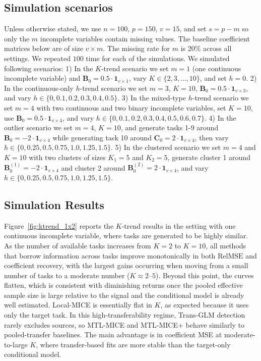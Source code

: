 \documentclass[12pt]{article}
\begin{document}
\subsection{Simulation scenarios}
Unless otherwise stated, we use $n=100$, $p=150$, $v=15$, and set $s=p-m$ so only the $m$ incomplete
variables contain missing values. The baseline coefficient matrices below are of size $v\times m$. The missing rate for $m$ is 20\% across all settings. We repeated $100$ time for each of the simulations. We simulated following scenarios: 1) In the $K$-trend scenario we set $m=1$ (one continuous incomplete variable) and $\bm{B}_0=0.5\cdot \bm{1}_{v\times 1}$, vary $K\in\{2,3,\dots,10\}$, and set $h=0$. 2) In the continuous-only $h$-trend scenario we set $m=3$, $K=10$, $\bm{B}_0=0.5\cdot \bm{1}_{v\times 3}$, and vary $h\in\{0,0.1,0.2,0.3,0.4,0.5\}$. 3) In the mixed-type $h$-trend scenario we set $m=4$ with two continuous and two binary incomplete variables, set $K=10$, use $\bm{B}_0=0.5\cdot \bm{1}_{v\times 4}$, and vary $h\in\{0,0.1,0.2,0.3,0.4,0.5,0.6,0.7\}$. 4) In the outlier scenario we set $m=4$, $K=10$, and generate tasks 1-9 around $\bm{B}_0=-2\cdot \bm{1}_{v\times 4}$ while generating task 10 around $\bm{C}_0=2\cdot \bm{1}_{v\times 4}$, then vary $h\in\{0,0.25,0.5,0.75,1.0,1.25,1.5\}$. 5) In the clustered scenario we set $m=4$ and $K=10$ with two clusters of sizes $K_1=5$ and $K_2=5$, generate cluster 1 around $\bm{B}^{(1)}_0=-2\cdot \bm{1}_{v\times 4}$ and cluster 2 around $\bm{B}^{(2)}_0=2\cdot \bm{1}_{v\times 4}$, and vary $h\in\{0,0.25,0.5,0.75,1.0,1.25,1.5\}$.

\subsection{Simulation Results}

Figure~\ref{fig:ktrend_1x2} reports the $K$-trend results in the setting with one continuous incomplete variable, where tasks are generated to be highly similar. As the number of available tasks increases from $K=2$ to $K=10$, all methods that borrow information across tasks improve monotonically in both $\mathrm{RelMSE}$ and coefficient recovery, with the largest gains occurring when moving from a small number of tasks to a moderate number ($K\approx 2$--$5$). Beyond this point, the curves flatten, which is consistent with diminishing returns once the pooled effective sample size is large relative to the signal and the conditional model is already well estimated. Local-MICE is essentially flat in $K$, as expected because it uses only the target task. In this high-transferability regime, Trans-GLM detection rarely excludes sources, so MTL-MICE and MTL-MICE+ behave similarly to pooled-transfer baselines. The main advantage is in coefficient MSE at moderate-to-large $K$, where transfer-based fits are more stable than the target-only conditional model.
\end{document}

